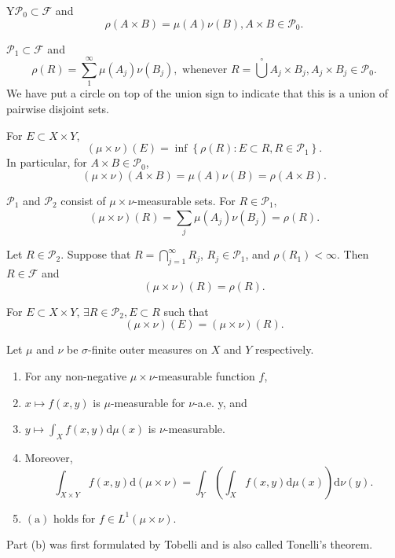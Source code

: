 \begin{lemma}
  Y$\mathcal{P}_0\subset \mathcal{F}$ and 
  \[
    \rho(A\times B)=\mu(A)\nu(B), A\times B\in \mathcal{P}_0.
  \] 
\end{lemma}
\begin{lemma}
  $\mathcal{P}_1\subset \mathcal{F}$ and 
  \[
    \rho(R)=\sum_{1}^{\infty} \mu(A_j)\nu(B_j), \text{ whenever } R=\overset{\circ}{\bigcup}A_j\times B_j, A_j\times B_j\in \mathcal{P}_0. 
  \] 
  We have put a circle on top of the union sign to indicate that this is a union of pairwise disjoint sets.
\end{lemma}
\begin{lemma}
  For $E\subset X\times Y$,
  \[
    (\mu\times \nu)(E)=\inf\left\{ \rho(R):E\subset R,R\in \mathcal{P}_1 \right\} .
  \] 
  In particular, for $A\times B\in \mathcal{P}_0$,
  \[
    (\mu\times \nu)(A\times B)=\mu(A)\nu(B)=\rho(A\times B).
  \] 
\end{lemma}

\begin{lemma}
  $\mathcal{P}_1$ and $\mathcal{P}_2$ consist of $\mu\times\nu$-measurable sets. For $R\in \mathcal{P}_1$,
  \[
    (\mu\times\nu)(R)=\sum_{j}^{} \mu(A_j)\nu(B_j)=\rho(R).
  \] 
\end{lemma}

\begin{lemma}
  Let $R\in \mathcal{P}_2$. Suppose that $R=\bigcap_{j=1} ^{\infty}R_j$, $R_j\in \mathcal{P}_1$, and $\rho(R_1)<\infty$. Then $R\in \mathcal{F}$ and 
  \[
    (\mu\times\nu)(R)=\rho(R).
  \] 
\end{lemma}

\begin{lemma}
  For $E\subset  X\times Y$, $\exists R  \in \mathcal{P}_2, E\subset R$ such that 
  \[
    (\mu\times\nu)(E)=(\mu\times\nu)(R).
  \] 
\end{lemma}

\begin{theorem}
  Let $\mu$ and $\nu$ be $\sigma$-finite outer measures on $X$ and $Y$ respectively.
  \begin{enumerate}
    \item For any non-negative $\mu\times\nu$-measurable function $f$,
    \item [] $x\mapsto f(x,y)$ is $\mu$-measurable for $\nu$-a.e. y, and
    \item [] $y\mapsto \int_X f(x,y)\mathrm{d}\mu(x)$ is $\nu$-measurable.
    \item [] Moreover,
      \[
	\int_{X\times Y}f(x,y)\mathrm{d}(\mu\times \nu)=\int_{Y}\left( \int_X f(x,y)\mathrm{d}\mu(x) \right) \mathrm{d}\nu(y).
      \] 
    \item  $\mathrm{(a)}$ holds for $f\in L^{1}(\mu\times\nu)$.
  \end{enumerate}
\end{theorem}
Part (b) was first formulated by Tobelli and is also called Tonelli's theorem.
